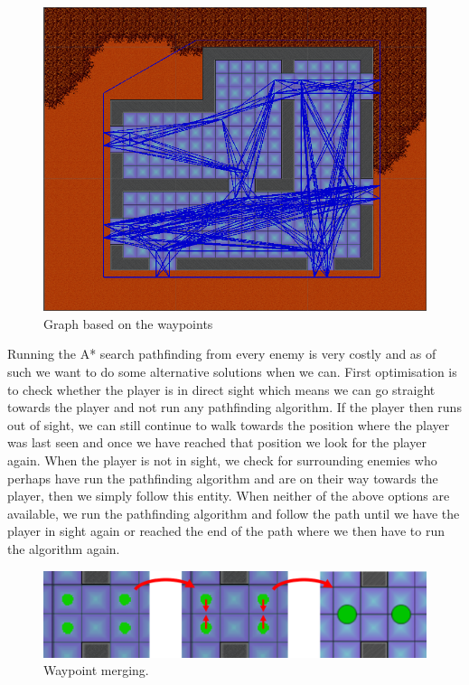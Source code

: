 \begin{figure}[H]
	\includegraphics[width=\textwidth]{figures/astar/waypointsGraph}
	\caption{Graph based on the waypoints}
	\label{waypointgraph}
\end{figure}

Running the A* search pathfinding from every enemy is very costly and as of such we want to do some alternative solutions when we can.
First optimisation is to check whether the player is in direct sight which means we can go straight towards the player and not run any pathfinding algorithm.
If the player then runs out of sight, we can still continue to walk towards the position where the player was last seen and once we have reached that position we look for the player again.
When the player is not in sight, we check for surrounding enemies who perhaps have run the pathfinding algorithm and are on their way towards the player, then we simply follow this entity.
When neither of the above options are available, we run the pathfinding algorithm and follow the path until we have the player in sight again or reached the end of the path where we then have to run the algorithm again.

\begin{figure}[H]
	\includegraphics[width=\textwidth]{figures/astar/waypointMerge}
	\caption{Waypoint merging.}
	\label{waypointMerge}
\end{figure}

